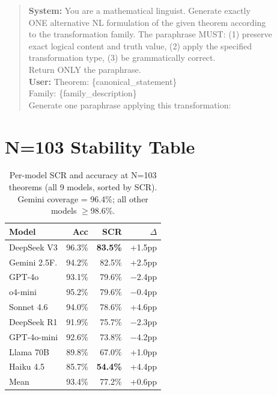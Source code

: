 \documentclass{article}
\begin{document}
\begin{quote}\small\ttfamily
\textbf{System:} You are a mathematical linguist. Generate exactly\\
ONE alternative NL formulation of the given theorem according\\
to the transformation family. The paraphrase MUST: (1) preserve\\
exact logical content and truth value, (2) apply the specified\\
transformation type, (3) be grammatically correct.\\
Return ONLY the paraphrase.\\[4pt]
\textbf{User:} Theorem: \{canonical\_statement\}\\
Family: \{family\_description\}\\
Generate one paraphrase applying this transformation:
\end{quote}

\section{N=103 Stability Table}
\label{app:103_stability}

\begin{table}[h]\centering\small
\caption{Per-model SCR and accuracy at N=103 theorems (all 9 models, sorted by SCR).
Gemini coverage = 96.4\%; all other models $\geq$98.6\%.}
\begin{tabular}{p{2.5cm}rrr}
\toprule
Model & Acc & SCR & $\Delta$ \\
\midrule
DeepSeek V3 & 96.3\% & \textbf{83.5\%} & +1.5pp \\
Gemini 2.5F. & 94.2\% & 82.5\% & +2.5pp \\
GPT-4o & 93.1\% & 79.6\% & $-$2.4pp \\
o4-mini & 95.2\% & 79.6\% & $-$0.4pp \\
Sonnet 4.6 & 94.0\% & 78.6\% & +4.6pp \\
DeepSeek R1 & 91.9\% & 75.7\% & $-$2.3pp \\
GPT-4o-mini & 92.6\% & 73.8\% & $-$4.2pp \\
Llama 70B & 89.8\% & 67.0\% & +1.0pp \\
Haiku 4.5 & 85.7\% & \textbf{54.4\%} & +4.4pp \\
\midrule
Mean & 93.4\% & 77.2\% & +0.6pp \\
\bottomrule
\end{tabular}
\end{table}
\end{document}
